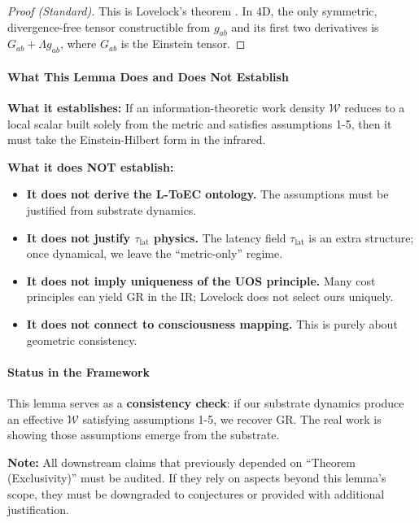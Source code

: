 \documentclass[11pt,titlepage]{article}
\begin{document}
\begin{proof}[Proof (Standard)]
This is Lovelock's theorem \cite{Lovelock1971, Lovelock1972}. In 4D, the only symmetric, divergence-free tensor constructible from $g_{ab}$ and its first two derivatives is $G_{ab} + \Lambda g_{ab}$, where $G_{ab}$ is the Einstein tensor.
\end{proof}

\paragraph{What This Lemma Does and Does Not Establish}
\begin{tcolorbox}[colback=yellow!5!white,colframe=yellow!75!black,title=Scope and Limitations]
\textbf{What it establishes:} If an information-theoretic work density $\mathcal{W}$ reduces to a local scalar built solely from the metric and satisfies assumptions 1-5, then it must take the Einstein-Hilbert form in the infrared.

\textbf{What it does NOT establish:}
\begin{itemize}
    \item \textbf{It does not derive the L-ToEC ontology.} The assumptions must be justified from substrate dynamics.
    \item \textbf{It does not justify $\tau_{\mathrm{lat}}$ physics.} The latency field $\tau_{\mathrm{lat}}$ is an extra structure; once dynamical, we leave the ``metric-only'' regime.
    \item \textbf{It does not imply uniqueness of the UOS principle.} Many cost principles can yield GR in the IR; Lovelock does not select ours uniquely.
    \item \textbf{It does not connect to consciousness mapping.} This is purely about geometric consistency.
\end{itemize}
\end{tcolorbox}

\paragraph{Status in the Framework}
This lemma serves as a \textbf{consistency check}: if our substrate dynamics produce an effective $\mathcal{W}$ satisfying assumptions 1-5, we recover GR. The real work is showing those assumptions emerge from the substrate.

\textbf{Note:} All downstream claims that previously depended on ``Theorem (Exclusivity)'' must be audited. If they rely on aspects beyond this lemma's scope, they must be downgraded to conjectures or provided with additional justification.
\end{document}
